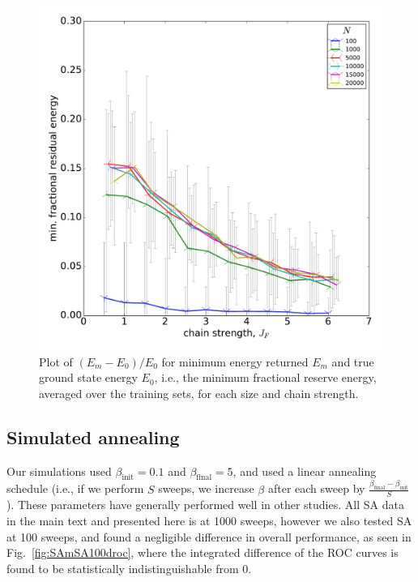  \begin{figure}[hbb]
 \centering
  \includegraphics[width=0.7\columnwidth]{chapters/Higgs/minimum_fractional_residual_energy_by_J}
  \caption{Plot of $(E_m-E_0)/E_0$ for minimum energy returned $E_m$ and true ground state energy $E_0$, i.e., the minimum fractional reserve energy, averaged over the training sets, for each size and chain strength.}
  \label{fig:minimum_fractional_residual_energy}
\end{figure}


\subsection{Simulated annealing}
Our simulations used $\beta_{\mathrm{init}}=0.1$ and $\beta_{\mathrm{final}} = 5$, and used a linear annealing schedule (i.e., if we perform $S$ sweeps, we increase $\beta$ after each sweep by $\frac{\beta_{\mathrm{final}}-\beta_{\mathrm{init}}}{S}$). These parameters have generally performed well in other studies.\cite{Hen:2015rt} All SA data in the main text and presented here is at 1000 sweeps, however we also tested SA at 100 sweeps, and found a negligible difference in overall performance, as seen in Fig.~\ref{fig:SAmSA100droc}, where the integrated difference of the ROC curves is found to be statistically indistinguishable from $0$.

